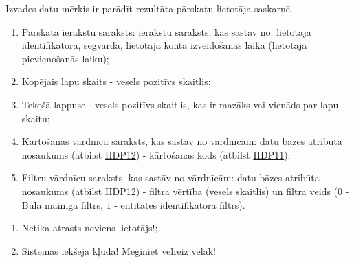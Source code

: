 {
	Izvades datu mērķis ir parādīt rezultāta pārskatu lietotāja saskarnē.
	\begin{enumerate}
		\item Pārskata ierakstu saraksts: ierakstu saraksts, kas sastāv no: lietotāja identifikatora, segvārda, lietotāja konta izveidošanas laika (lietotāja pievienošanās laiku);
		\item Kopējais lapu skaits - vesels pozitīvs skaitlis;
		\item Tekošā lappuse - vesels pozitīvs skaitlis, kas ir mazāks vai vienāds par lapu skaitu;
		\item Kārtošanas vārdnīcu saraksts, kas sastāv no vārdnīcām: datu bāzes atribūta nosaukums (atbilst \hyperref[tab:IIDP12]{IIDP12}) - kārtošanas kods (atbilst \hyperref[tab:IIDP11]{IIDP11});
		\item Filtru vārdnīcu saraksts, kas sastāv no vārdnīcām: datu bāzes atribūta nosaukums (atbilst \hyperref[tab:IIDP12]{IIDP12}) - filtra vērtība (vesels skaitlis) un filtra veids ($0$ - Būla mainīgā filtrs, $1$ - entitātes identifikatora filtrs).
	\end{enumerate}
}
{
	\begin{enumerate}
		\item Netika atrasts neviens lietotājs!;
		\item Sistēmas iekšējā kļūda! Mēģiniet vēlreiz vēlāk!
	\end{enumerate}
}
